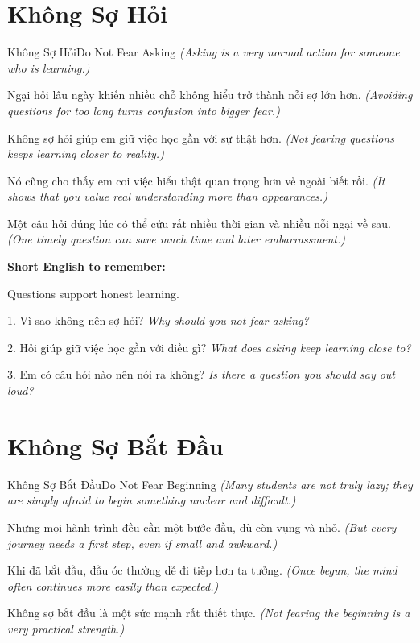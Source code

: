 \section{Không Sợ Hỏi}
\begin{truyen}{Không Sợ Hỏi}{Do Not Fear Asking}
\textit{(Asking is a very normal action for someone who is learning.)}

Ngại hỏi lâu ngày khiến nhiều chỗ không hiểu trở thành nỗi sợ lớn hơn.
\textit{(Avoiding questions for too long turns confusion into bigger fear.)}

Không sợ hỏi giúp em giữ việc học gần với sự thật hơn.
\textit{(Not fearing questions keeps learning closer to reality.)}

Nó cũng cho thấy em coi việc hiểu thật quan trọng hơn vẻ ngoài biết rồi.
\textit{(It shows that you value real understanding more than appearances.)}
\end{truyen}

\begin{baihoc}
Một câu hỏi đúng lúc có thể cứu rất nhiều thời gian và nhiều nỗi ngại về sau.
\textit{(One timely question can save much time and later embarrassment.)}
\end{baihoc}

\begin{ghinhoanh}
\textbf{Short English to remember:}

Questions support honest learning.

\end{ghinhoanh}

\begin{tuhocnhanh}
1. Vì sao không nên sợ hỏi? \textit{Why should you not fear asking?}

2. Hỏi giúp giữ việc học gần với điều gì? \textit{What does asking keep learning close to?}

3. Em có câu hỏi nào nên nói ra không? \textit{Is there a question you should say out loud?}
\end{tuhocnhanh}
\ngancach

\section{Không Sợ Bắt Đầu}
\begin{truyen}{Không Sợ Bắt Đầu}{Do Not Fear Beginning}
\textit{(Many students are not truly lazy; they are simply afraid to begin something unclear and difficult.)}

Nhưng mọi hành trình đều cần một bước đầu, dù còn vụng và nhỏ.
\textit{(But every journey needs a first step, even if small and awkward.)}

Khi đã bắt đầu, đầu óc thường dễ đi tiếp hơn ta tưởng.
\textit{(Once begun, the mind often continues more easily than expected.)}

Không sợ bắt đầu là một sức mạnh rất thiết thực.
\textit{(Not fearing the beginning is a very practical strength.)}
\end{truyen}

